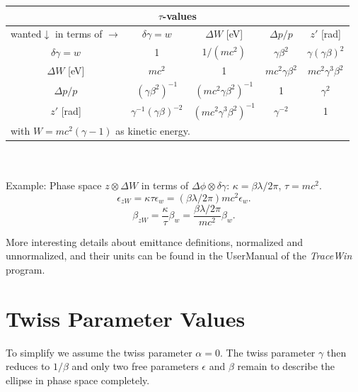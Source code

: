 \documentclass{article}
\begin{document}
\begin{tabular}{|c|c|c|c|c|}
\hline
\multicolumn{5}{|c|}{\textbf{$\tau$-values}} \\
\hline
wanted$\downarrow$ in terms of
$\rightarrow$                  &$\delta\gamma = w$              &$\Delta W$ [eV]              &$\Delta p/p$        &$z'$ [rad]    \\
\hline
$\delta\gamma = w$             &1                               &$1/(mc^2)$                   &$\gamma\beta^2$     &$\gamma(\gamma\beta)^2$ \\ 
$\Delta W$ [eV]                &$mc^2$                          &1                            &$mc^2\gamma\beta^2$ &$mc^2\gamma^3\beta^2$ \\
$\Delta p/p$                   &$(\gamma\beta^2)^{-1}$          &$(mc^2\gamma\beta^2)^{-1}$   &1                   &$\gamma^2$ \\
$z'$ [rad]                     &$\gamma^{-1}(\gamma\beta)^{-2}$ &$(mc^2\gamma^3\beta^2)^{-1}$ &$\gamma^{-2}$       &1  \\
\hline
\multicolumn{5}{|l|}{with $W = mc^2 (\gamma-1)$ as kinetic energy.} \\
\hline
\end{tabular} \\ \\

Example: Phase space $z\otimes\Delta W$ in terms of $\Delta\phi\otimes\delta\gamma$: $\kappa = \beta\lambda/2\pi$, $\tau = mc^2$.
\begin{equation}
\epsilon_{zW} = \kappa\tau\epsilon_w=(\beta\lambda/2\pi) mc^2\epsilon_w.
\end{equation}
\begin{equation}
\beta_{zW} = \frac{\kappa}{\tau}\beta_w=\frac{\beta\lambda/2\pi}{mc^2}\beta_w.
\end{equation}

More interesting details about emittance definitions, normalized and unnormalized, and their units can be found in the UserManual of the \emph{TraceWin} program.

\section{Twiss Parameter Values}
To simplify we assume the twiss parameter $ \alpha = 0 $. The twiss  parameter $ \gamma $ then reduces to $ 1/{\beta} $
and only two free parameters $ \epsilon $ and $ \beta $ remain to describe the ellipse in phase space completely.
\end{document}
